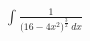 \documentclass[preview]{standalone}
\begin{document}
\begin{align*}
\int \frac{1}{({16-4x^2)^\frac{3}{2}} \ dx}
\end{align*}
\end{document}
